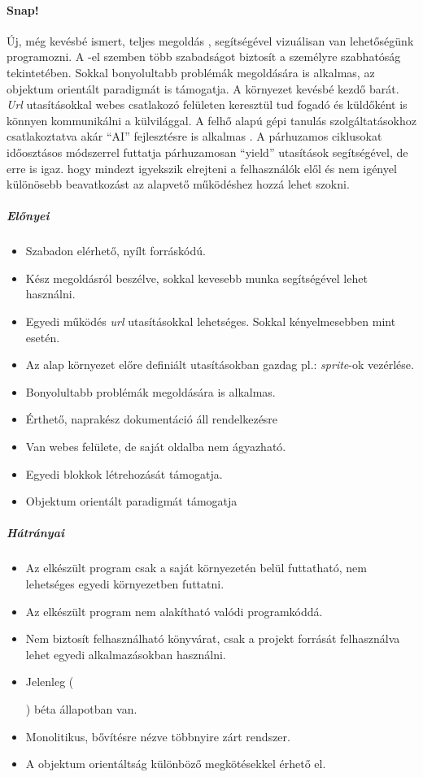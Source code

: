 \documentclass[12pt,a4paper,oneside]{report} %
\begin{document}
\paragraph{Snap!} \label{snap}Új, még kevésbé  ismert, teljes megoldás \cite{harvey2013snap}, segítségével vizuálisan van lehetőségünk programozni. A -el szemben több szabadságot biztosít a személyre szabhatóság tekintetében. Sokkal bonyolultabb problémák megoldására is alkalmas, az objektum orientált paradigmát is támogatja. A környezet kevésbé kezdő barát. \textit{Url} utasításokkal webes  csatlakozó felületen keresztül tud fogadó és küldőként is könnyen kommunikálni a külvilággal. A felhő alapú gépi tanulás szolgáltatásokhoz csatlakoztatva akár ``AI'' fejlesztésre is alkalmas \cite{kahn2018ai}. A párhuzamos ciklusokat időosztásos módszerrel futtatja párhuzamosan ``yield'' utasítások segítségével, de erre is igaz. hogy mindezt igyekszik elrejteni a felhasználók elől és nem igényel különösebb beavatkozást az alapvető működéshez hozzá lehet szokni.
\subparagraph{Előnyei} 
\begin{itemize}
	\item Szabadon elérhető, nyílt forráskódú.
	\item Kész megoldásról beszélve, sokkal kevesebb munka segítségével lehet használni.
	\item Egyedi működés \textit{url} utasításokkal lehetséges. Sokkal kényelmesebben mint  esetén.
	\item Az alap környezet előre definiált utasításokban gazdag pl.: \textit{sprite}-ok vezérlése.
	\item Bonyolultabb problémák megoldására is alkalmas.
	\item Érthető, naprakész dokumentáció áll rendelkezésre
	\item Van webes felülete, de saját oldalba nem ágyazható.
	\item Egyedi blokkok létrehozását támogatja.
	\item Objektum orientált paradigmát támogatja
\end{itemize}
\subparagraph{Hátrányai} 
\begin{itemize}
	\item Az elkészült program csak a saját környezetén belül futtatható, nem lehetséges egyedi környezetben futtatni.
	\item Az elkészült program nem alakítható valódi programkóddá.
	\item Nem biztosít felhasználható könyvárat, csak a projekt forrását felhasználva lehet egyedi alkalmazásokban használni.
	\item Jelenleg (\date{\today}) béta állapotban van.
	\item Monolitikus, bővítésre nézve többnyire zárt rendszer.
	\item A objektum orientáltság különböző megkötésekkel érhető el.
\end{itemize}
\end{document}
